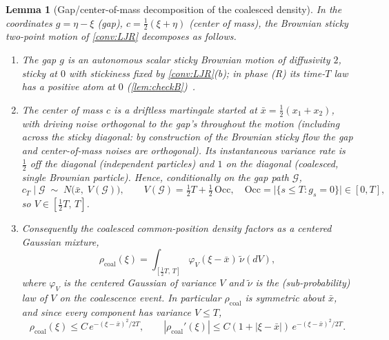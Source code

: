 \documentclass[reqno,final,11pt]{amsart}
\theoremstyle{plain}
\newtheorem{lemma}[theorem]{Lemma}
\theoremstyle{definition}
\theoremstyle{remark}
\begin{document}
\begin{lemma}[Gap/center-of-mass decomposition of the coalesced density]\label{lem:gap-com}
In the coordinates $g=\eta-\xi$ (gap), $c=\tfrac12(\xi+\eta)$ (center of mass), the
Brownian sticky two-point motion of \cref{conv:LJR} decomposes as follows.
\begin{enumerate}
\item[(i)] The gap $g$ is an autonomous scalar sticky Brownian motion of diffusivity
$2$, sticky at $0$ with stickiness fixed by \cref{conv:LJR}(b); in phase (R) its time-$T$
law has a positive atom at $0$ (\cref{lem:checkB})~\citep{EngelbertPeskir,ItoMcKean}.
\item[(ii)] The center of mass $c$ is a driftless martingale started at
$\bar x=\tfrac12(x_1+x_2)$, with driving noise orthogonal to the gap's throughout the
motion (including across the sticky diagonal: by construction of the Brownian sticky
flow the gap and center-of-mass noises are orthogonal). Its instantaneous variance rate
is $\tfrac12$ off the diagonal (independent particles) and $1$ on the diagonal
(coalesced, single Brownian particle). Hence, conditionally on the gap path $\mathcal G$,
\[
  c_T \mid \mathcal G \;\sim\; N\!\bigl(\bar x,\; V(\mathcal G)\bigr),\qquad
  V(\mathcal G)=\tfrac12 T+\tfrac12\,\mathrm{Occ},\quad
  \mathrm{Occ}=\bigl|\{s\le T: g_s=0\}\bigr|\in[0,T],
\]
so $V\in[\tfrac12 T,\,T]$.
\item[(iii)] Consequently the coalesced common-position density factors as a centered
Gaussian mixture,
\[
  \rho_{\mathrm{coal}}(\xi)=\int_{[\frac12 T,\,T]}\varphi_V(\xi-\bar x)\,\tilde\nu(dV),
\]
where $\varphi_V$ is the centered Gaussian of variance $V$ and $\tilde\nu$ is the
(sub-probability) law of $V$ on the coalescence event. In particular
$\rho_{\mathrm{coal}}$ is symmetric about $\bar x$, and since every component has
variance $V\le T$,
\[
  \rho_{\mathrm{coal}}(\xi)\le C\,e^{-(\xi-\bar x)^2/2T},\qquad
  |\rho_{\mathrm{coal}}'(\xi)|\le C(1+|\xi-\bar x|)\,e^{-(\xi-\bar x)^2/2T}.
\]
\end{enumerate}
\end{lemma}
\end{document}
